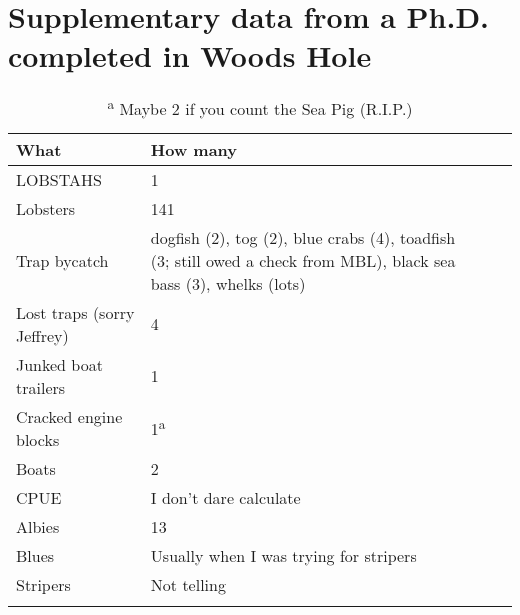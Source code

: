 
\begingroup%
\makeatletter%
\cleardoublepage%
\let\newpage\relax%
\let\clearpage\relax%
\vspace*{\fill}%
\vspace*{\dimexpr-50\p@-\baselineskip}%
\chapter[Supplementary data from a Ph.D. completed in Woods Hole]{Supplementary data from a Ph.D. completed in Woods Hole}
\label{AppF}
\vspace*{\fill}%
\endgroup%

\clearpage

\begin{normalsize}
\begin{singlespace}
\begin{flushleft}
\begin{longtable}{ Lp{.48\linewidth} Lp{.48\linewidth} }
\caption[Supplementary data from a Ph.D. completed in Woods Hole]{Supplementary data from a Ph.D. completed in Woods Hole}
\label{table:afn1}
\endfirsthead
\endhead
\toprule
What & How many \\
\midrule
LOBSTAHS & 1 \\
Lobsters & 141 \\
Trap bycatch & dogfish (2), tog (2), blue crabs (4), toadfish (3; still owed a check from MBL), black sea bass (3), whelks (lots) \\
Lost traps (sorry Jeffrey) & 4 \\
Junked boat trailers & 1 \\
Cracked engine blocks & 1\textsuperscript{a} \\
Boats & 2 \\
CPUE & I don't dare calculate \\
Albies & 13 \\
Blues & Usually when I was trying for stripers \\
Stripers & Not telling \\
\bottomrule
{}
\caption*{\textsuperscript{a} Maybe 2 if you count the Sea Pig (R.I.P.)
}
\end{longtable}
\end{flushleft}
\end{singlespace}
\end{normalsize}